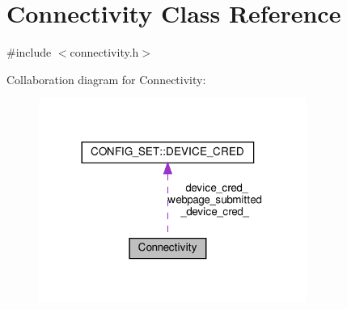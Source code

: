 \hypertarget{classConnectivity}{}\section{Connectivity Class Reference}
\label{classConnectivity}


{\ttfamily \#include $<$connectivity.\+h$>$}



Collaboration diagram for Connectivity\+:
\nopagebreak
\begin{figure}[H]
\begin{center}
\leavevmode
\includegraphics[width=248pt]{classConnectivity__coll__graph}
\end{center}
\end{figure}
